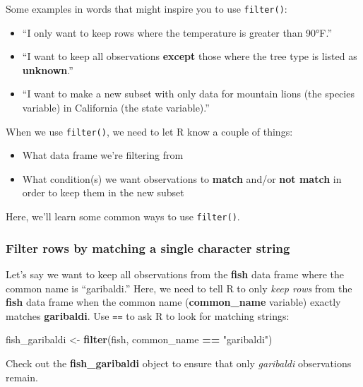 \documentclass[]{book}
\newenvironment{Shaded}{\begin{snugshade}}{\end{snugshade}}
\newcommand{\KeywordTok}[1]{\textcolor[rgb]{0.13,0.29,0.53}{\textbf{#1}}}
\newcommand{\NormalTok}[1]{#1}
\newcommand{\OperatorTok}[1]{\textcolor[rgb]{0.81,0.36,0.00}{\textbf{#1}}}
\newcommand{\StringTok}[1]{\textcolor[rgb]{0.31,0.60,0.02}{#1}}
\providecommand{\tightlist}{%
  \setlength{\itemsep}{0pt}\setlength{\parskip}{0pt}}
\begin{document}
Some examples in words that might inspire you to use \texttt{filter()}:

\begin{itemize}
\tightlist
\item
  ``I only want to keep rows where the temperature is greater than 90°F.''
\item
  ``I want to keep all observations \textbf{except} those where the tree type is listed as \textbf{unknown}.''
\item
  ``I want to make a new subset with only data for mountain lions (the species variable) in California (the state variable).''
\end{itemize}

When we use \texttt{filter()}, we need to let R know a couple of things:

\begin{itemize}
\tightlist
\item
  What data frame we're filtering from
\item
  What condition(s) we want observations to \textbf{match} and/or \textbf{not match} in order to keep them in the new subset
\end{itemize}

Here, we'll learn some common ways to use \texttt{filter()}.

\hypertarget{filter-rows-by-matching-a-single-character-string}{%
\subsubsection{Filter rows by matching a single character string}\label{filter-rows-by-matching-a-single-character-string}}

Let's say we want to keep all observations from the \textbf{fish} data frame where the common name is ``garibaldi.'' Here, we need to tell R to only \emph{keep rows} from the \textbf{fish} data frame when the common name (\textbf{common\_name} variable) exactly matches \textbf{garibaldi}.
Use \texttt{==} to ask R to look for matching strings:

\begin{Shaded}
\begin{Highlighting}[]
\NormalTok{fish_garibaldi <-}\StringTok{ }\KeywordTok{filter}\NormalTok{(fish, common_name }\OperatorTok{==}\StringTok{ "garibaldi"}\NormalTok{)}
\end{Highlighting}
\end{Shaded}

Check out the \textbf{fish\_garibaldi} object to ensure that only \emph{garibaldi} observations remain.
\end{document}
